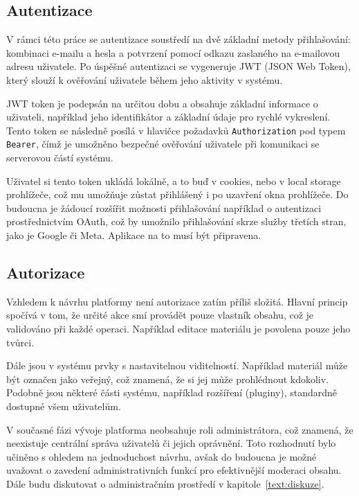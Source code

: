 \subsection{Autentizace}

V rámci této práce se autentizace soustředí na dvě základní metody přihlašování: kombinaci e-mailu a hesla a potvrzení pomocí odkazu zaslaného na e-mailovou adresu uživatele. 
Po úspěšné autentizaci se vygeneruje JWT (JSON Web Token), který slouží k ověřování uživatele během jeho aktivity v systému.

JWT token je podepsán na určitou dobu a obsahuje základní informace o uživateli, například jeho identifikátor a základní údaje pro rychlé vykreslení. 
Tento token se následně posílá v hlavičce požadavků \texttt{Authorization} pod typem \texttt{Bearer}, čímž je umožněno bezpečné ověřování uživatele při komunikaci se serverovou částí systému.

Uživatel si tento token ukládá lokálně, a to buď v cookies, nebo v local storage prohlížeče, což mu umožňuje zůstat přihlášený i po uzavření okna prohlížeče. 
Do budoucna je žádoucí rozšířit možnosti přihlašování například o autentizaci prostřednictvím OAuth, což by umožnilo přihlašování skrze služby třetích stran, jako je Google či Meta.
Aplikace na to musí být připravena.

\subsection{Autorizace}

Vzhledem k návrhu platformy není autorizace zatím příliš složitá. 
Hlavní princip spočívá v tom, že určité akce smí provádět pouze vlastník obsahu, což je validováno při každé operaci.
Například editace materiálu je povolena pouze jeho tvůrci. 

Dále jsou v systému prvky s nastavitelnou viditelností. 
Například materiál může být označen jako veřejný, což znamená, že si jej může prohlédnout kdokoliv. 
Podobně jsou některé části systému, například rozšíření (pluginy), standardně dostupné všem uživatelům.

V současné fázi vývoje platforma neobsahuje roli administrátora, což znamená, že neexistuje centrální správa uživatelů či jejich oprávnění. 
Toto rozhodnutí bylo učiněno s ohledem na jednoduchost návrhu, avšak do budoucna je možné uvažovat o zavedení administrativních funkcí pro efektivnější moderaci obsahu.
Dále budu diskutovat o administračním prostředí v kapitole~\ref{text:diskuze}.